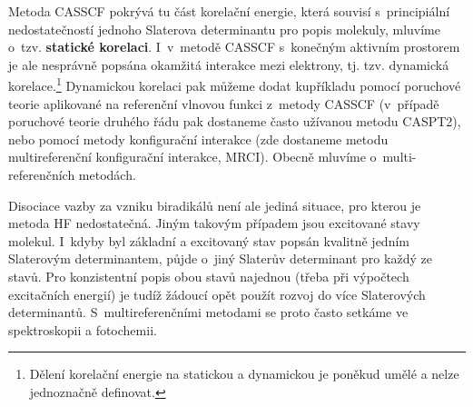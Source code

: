 Metoda CASSCF pokrývá tu část korelační energie, která souvisí s~principiální nedostatečností jednoho Slaterova determinantu pro popis molekuly, mluvíme o~tzv. \textbf{statické korelaci}. I~v~metodě CASSCF s~konečným aktivním prostorem je ale nesprávně popsána okamžitá interakce mezi elektrony, tj. tzv. dynamická korelace.\footnote{Dělení korelační energie na statickou a dynamickou je poněkud umělé a nelze jednoznačně definovat.} Dynamickou korelaci pak můžeme dodat kupříkladu pomocí poruchové teorie aplikované na referenční vlnovou funkci z~metody CASSCF (v~případě poruchové teorie druhého řádu pak dostaneme často užívanou metodu CASPT2), nebo pomocí metody konfigurační interakce (zde dostaneme metodu multireferenční konfigurační interakce, MRCI). Obecně mluvíme o~multi-referenčních metodách.

Disociace vazby za vzniku biradikálů není ale jediná situace, pro kterou je metoda HF nedostatečná. Jiným takovým případem jsou excitované stavy molekul. I~kdyby byl základní a excitovaný stav popsán kvalitně jedním Slaterovým determinantem, půjde o~jiný Slaterův determinant pro každý ze stavů. Pro konzistentní popis obou stavů najednou (třeba při výpočtech excitačních energií) je tudíž žádoucí opět použít rozvoj do více Slaterových determinantů. S~multireferenčními metodami se proto často setkáme ve spektroskopii a fotochemii. 